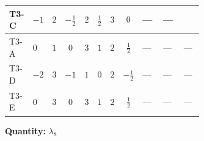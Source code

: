 \documentclass[8pt]{article}
\begin{document}
\begin{landscape}
\begin{longtable}{@{}llcccccc >{\raggedright\arraybackslash}p{0.21\linewidth} >{\raggedright\arraybackslash}p{0.21\linewidth} >{\raggedright\arraybackslash}p{0.21\linewidth}@{}}
\midrule
T3-C & $-1$ & $2$ & $-\frac{1}{2}$ & $2$ & $\frac{1}{2}$ & $3$ & $0$ & --- & --- & \scriptsize\adjustbox{max width=\linewidth}{$\begin{gathered} +4 {\lambda_7} \left({\lambda_9}\right)^{*}\end{gathered}$} \\
\midrule
T3-A & $0$ & $1$ & $0$ & $3$ & $1$ & $2$ & $\frac{1}{2}$ & --- & --- & --- \\
\midrule
T3-D & $-2$ & $3$ & $-1$ & $1$ & $0$ & $2$ & $-\frac{1}{2}$ & --- & --- & --- \\
\midrule
T3-E & $0$ & $3$ & $0$ & $3$ & $1$ & $2$ & $\frac{1}{2}$ & --- & --- & --- \\
\midrule
\bottomrule
\end{longtable}
\clearpage
\noindent\textbf{Quantity: }$\lambda_{8}$\par\smallskip

\end{landscape}
\end{document}
